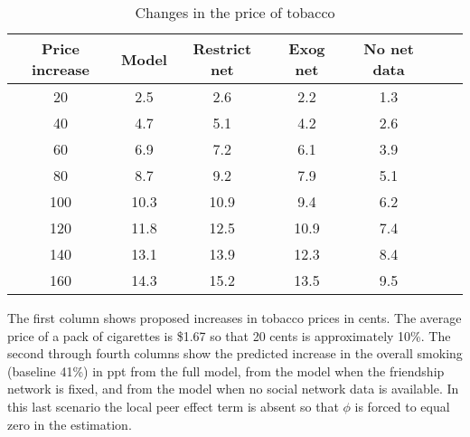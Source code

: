 
    \begin{table}[!t]
    \caption{Changes in the price of tobacco}
    \label{table:ctrf-price}
    \begin{center}
    \begin{tabular}{ccccccc}
    Price increase & Model  &  Restrict net &  Exog net & No net data\\ \hline \hline
      20 &  2.5 &  2.6 &  2.2 &  1.3 \\ 
  40 &  4.7 &  5.1 &  4.2 &  2.6 \\ 
  60 &  6.9 &  7.2 &  6.1 &  3.9 \\ 
  80 &  8.7 &  9.2 &  7.9 &  5.1 \\ 
 100 & 10.3 & 10.9 &  9.4 &  6.2 \\ 
 120 & 11.8 & 12.5 & 10.9 &  7.4 \\ 
 140 & 13.1 & 13.9 & 12.3 &  8.4 \\ 
 160 & 14.3 & 15.2 & 13.5 &  9.5 \\ 

    \hline
    \end{tabular}
    \end{center}
     The first column shows proposed increases in tobacco prices in cents. 
    The average price of a pack of cigarettes is \$1.67 so that 20 cents is approximately 10\%. 
    The second through fourth columns show the predicted increase in the overall smoking (baseline 41\%) in ppt 
    from the full model, from the model when the friendship network is fixed, and 
    from the model when no social network data is available. 
    In this last scenario the local peer effect term is absent so that $\phi$ is forced to equal zero in the estimation. 
    \end{table}
    